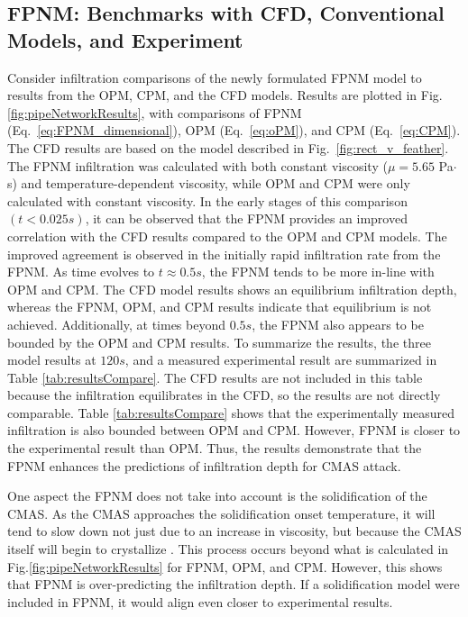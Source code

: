 \documentclass[%
 aip,
 amsmath,amssymb,
 reprint,%
floatfix]{revtex4-1}
\begin{document}
\subsection{FPNM: Benchmarks with CFD, Conventional Models, and Experiment}
Consider infiltration comparisons of the newly formulated FPNM model to results from the OPM, CPM, and the CFD models. 
Results are plotted in Fig. \ref{fig:pipeNetworkResults}, with comparisons of FPNM (Eq.~\ref{eq:FPNM_dimensional}), OPM (Eq.~\ref{eq:oPM}), and CPM (Eq.~\ref{eq:CPM}). The CFD results are based on the model described in Fig.~\ref{fig:rect_v_feather}. 
The FPNM infiltration was calculated with both constant viscosity ($\mu = 5.65$ Pa$\cdot$s) and temperature-dependent viscosity, while OPM and CPM were only calculated with constant viscosity.
In the early stages of this comparison $(t<0.025s)$, it can be observed that the FPNM provides an improved correlation with the CFD results compared to the OPM and CPM models. The improved agreement is observed in the initially rapid infiltration rate from the FPNM. 
As time evolves to $t\approx0.5s$, the FPNM tends to be more in-line with OPM and CPM. The CFD model results shows an equilibrium infiltration depth, whereas the FPNM, OPM, and CPM results indicate that equilibrium is not achieved. 
Additionally, at times beyond $0.5s$, the FPNM also appears to be bounded by the OPM and CPM results. 
To summarize the results, the three model results at $120 s$, and a measured experimental result are summarized in Table \ref{tab:resultsCompare}. The CFD results are not included in this table because the infiltration equilibrates in the CFD, so the results are not directly comparable.
Table \ref{tab:resultsCompare} shows that the experimentally measured infiltration is also bounded between OPM and CPM.
However, FPNM is closer to the experimental result than OPM. 
Thus, the results demonstrate that the FPNM enhances the predictions of infiltration depth for CMAS attack.

One aspect the FPNM does not take into account is the solidification of the CMAS. As the CMAS approaches the solidification onset temperature, it will tend to slow down not just due to an increase in viscosity, but because the CMAS itself will begin to crystallize \cite{Naraparaju2019}. This process occurs beyond what is calculated in Fig.\ref{fig:pipeNetworkResults} for FPNM, OPM, and CPM. However, this shows that FPNM is over-predicting the infiltration depth. If a solidification model were included in FPNM, it would align even closer to experimental results.
\end{document}
